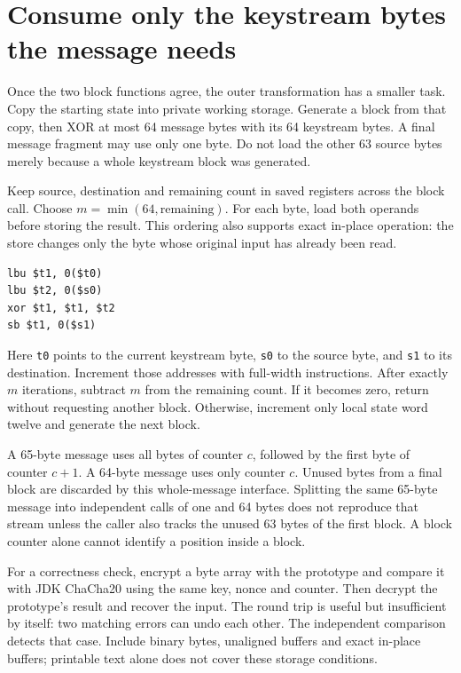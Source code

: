 \section{Consume only the keystream bytes the message needs}
Once the two block functions agree, the outer transformation has a smaller task.
Copy the starting state into private working storage. Generate a block from that
copy, then XOR at most 64 message bytes with its 64 keystream bytes. A final message
fragment may use only one byte. Do not load the other 63 source bytes merely because
a whole keystream block was generated.

Keep source, destination and remaining count in saved registers across the block
call. Choose \(m=\min(64,\text{remaining})\). For each byte, load both operands
before storing the result. This ordering also supports exact in-place operation:
the store changes only the byte whose original input has already been read.
\begin{verbatim}
lbu $t1, 0($t0)
lbu $t2, 0($s0)
xor $t1, $t1, $t2
sb $t1, 0($s1)
\end{verbatim}

Here \texttt{t0} points to the current keystream byte, \texttt{s0} to the source
byte, and \texttt{s1} to its destination. Increment those addresses with full-width
instructions. After exactly \(m\) iterations, subtract \(m\) from the remaining
count. If it becomes zero, return without requesting another block. Otherwise,
increment only local state word twelve and generate the next block.

A 65-byte message uses all bytes of counter \(c\), followed by the first byte of
counter \(c+1\). A 64-byte message uses only counter \(c\). Unused bytes from a final
block are discarded by this whole-message interface. Splitting the same 65-byte
message into independent calls of one and 64 bytes does not reproduce that stream
unless the caller also tracks the unused 63 bytes of the first block. A block counter
alone cannot identify a position inside a block.

For a correctness check, encrypt a byte array with the prototype and compare it
with JDK ChaCha20 using the same key, nonce and counter. Then decrypt the prototype's
result and recover the input. The round trip is useful but insufficient by itself:
two matching errors can undo each other. The independent comparison detects that
case. Include binary bytes, unaligned buffers and exact in-place buffers; printable
text alone does not cover these storage conditions.
